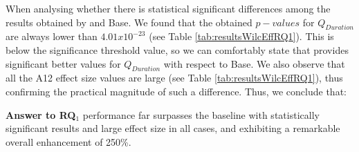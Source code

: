 
When analysing whether there is statistical significant differences among the results obtained by \simhotep{} and Base. We found that the obtained $p-values$ for $Q_{Duration}$ are always lower than $4.01x10^{-23}$  (see Table \ref{tab:resultsWilcEffRQ1}). This is below the significance threshold value, so we can comfortably state that \simhotep{} provides significant better values for $Q_{Duration}$ with respect to Base. We also observe that all the  A12 effect size values are large (see Table \ref{tab:resultsWilcEffRQ1}), thus confirming the practical magnitude of such a difference. Thus, we conclude that:

\noindent \textbf{Answer to RQ$_1$} \simhotep{} performance far surpasses the baseline with statistically significant results and large effect size in all cases, and exhibiting a remarkable overall enhancement of 250\%.

